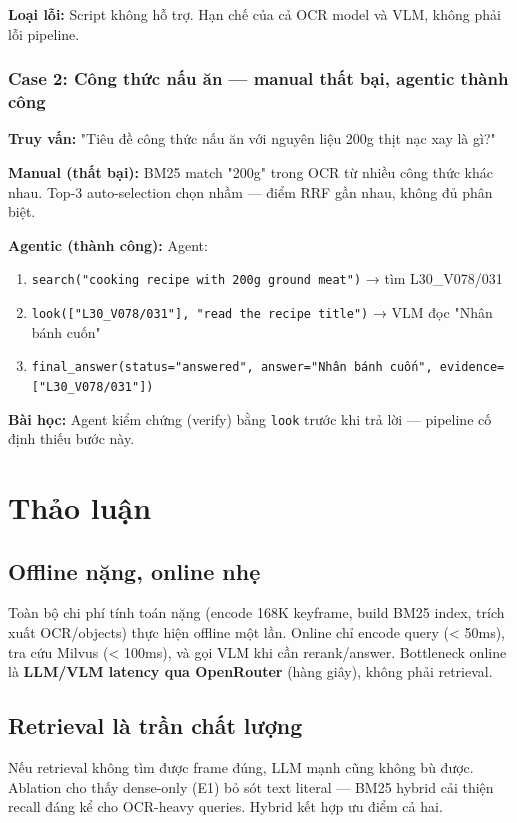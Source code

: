 \documentclass[12pt,a4paper,onecolumn]{article}
\begin{document}
\textbf{Loại lỗi:} Script không hỗ trợ. Hạn chế của cả OCR model và VLM, không phải lỗi pipeline.

\subsubsection{Case 2: Công thức nấu ăn — manual thất bại, agentic thành công}

\textbf{Truy vấn:} "Tiêu đề công thức nấu ăn với nguyên liệu 200g thịt nạc xay là gì?"

\textbf{Manual (thất bại):} BM25 match "200g" trong OCR từ nhiều công thức khác nhau. Top-3 auto-selection chọn nhầm — điểm RRF gần nhau, không đủ phân biệt.

\textbf{Agentic (thành công):} Agent:

\begin{enumerate}
  \item \texttt{search("cooking recipe with 200g ground meat")} → tìm L30\_V078/031
  \item \texttt{look(["L30\_V078/031"], "read the recipe title")} → VLM đọc "Nhân bánh cuốn"
  \item \texttt{final\_answer(status="answered", answer="Nhân bánh cuốn", evidence=["L30\_V078/031"])}
\end{enumerate}


\textbf{Bài học:} Agent kiểm chứng (verify) bằng \texttt{look} trước khi trả lời — pipeline cố định thiếu bước này.

\section{Thảo luận}

\subsection{Offline nặng, online nhẹ}

Toàn bộ chi phí tính toán nặng (encode 168K keyframe, build BM25 index, trích xuất OCR/objects) thực hiện offline một lần. Online chỉ encode query (< 50ms), tra cứu Milvus (< 100ms), và gọi VLM khi cần rerank/answer. Bottleneck online là \textbf{LLM/VLM latency qua OpenRouter} (hàng giây), không phải retrieval.

\subsection{Retrieval là trần chất lượng}

Nếu retrieval không tìm được frame đúng, LLM mạnh cũng không bù được. Ablation cho thấy dense-only (E1) bỏ sót text literal — BM25 hybrid cải thiện recall đáng kể cho OCR-heavy queries. Hybrid kết hợp ưu điểm cả hai.
\end{document}

